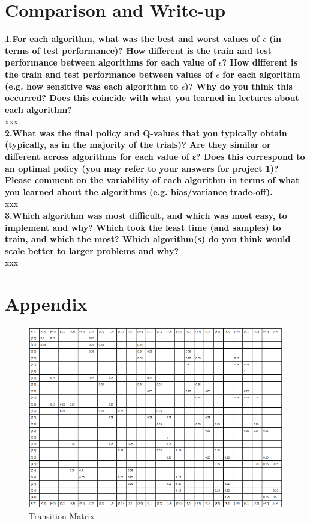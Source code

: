 \documentclass[11pt]{article}
\begin{document}
\section{Comparison and Write-up}
\textbf{1.For each algorithm, what was the best and worst values of $\epsilon$ (in terms of test
performance)? How different is the train and test performance between algorithms
for each value of $\epsilon$? How different is the train and test performance between values
of $\epsilon$ for each algorithm (e.g. how sensitive was each algorithm to $\epsilon$)? Why do you
think this occurred? Does this coincide with what you learned in lectures about
each algorithm?}
\\
\noindent
xxx
\\
\textbf{2.What was the final policy and Q-values that you typically obtain (typically, as in the
majority of the trials)? Are they similar or different across algorithms for each value
of ε? Does this correspond to an optimal policy (you may refer to your answers for
project 1)? Please comment on the variability of each algorithm in terms of what
you learned about the algorithms (e.g. bias/variance trade-off).}
\\
\noindent
xxx
\\
\textbf{3.Which algorithm was most difficult, and which was most easy, to implement and
why? Which took the least time (and samples) to train, and which the most? Which
algorithm(s) do you think would scale better to larger problems and why?}
\\
\noindent
xxx
\\

\newpage
\section{Appendix}

\begin{figure}[h]
\includegraphics[scale=0.5]{transition_matrix}
\centering
\caption{Transition Matrix}
\end{figure}
\end{document}
